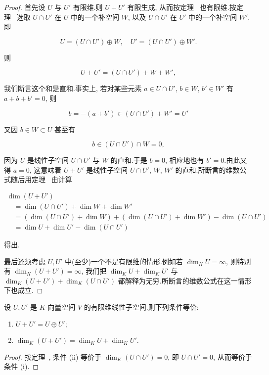 \begin{proof}
首先设 $U$ 与 $U'$ 有限维.则 $U + U'$ 有限生成, 从而按定理~ 也有限维.按定理~ 选取 $U \cap U'$ 在 $U$ 中的一个补空间 $W$, 以及 $U \cap U'$ 在 $U'$ 中的一个补空间 $W'$, 即

\[
U = (U \cap U') \oplus W, \quad U' = (U \cap U') \oplus W'\text{.}
\]

则

\[
U + U' = (U \cap U') + W + W',
\]

我们断言这个和是直和.事实上, 若对某些元素 $a \in U \cap U'$, $b \in W$, $b' \in W'$ 有 $a + b + b' = 0$, 则

\[
b = -(a + b') \in (U \cap U') + W' = U'
\]

又因 $b \in W \subset U$ 甚至有

\[
b \in (U \cap U') \cap W = 0,
\]

因为 $U$ 是线性子空间 $U \cap U'$ 与 $W$ 的直和.于是 $b = 0$, 相应地也有 $b' = 0$.由此又得 $a = 0$, 这意味着 $U + U'$ 是线性子空间 $U \cap U'$, $W$, $W'$ 的直和.所断言的维数公式随后用定理~ 由计算

\[
\begin{array}{l}
\dim (U + U') \\
\quad = \dim (U \cap U') + \dim W + \dim W' \\
\quad = \left(\dim (U \cap U') + \dim W\right) + \left(\dim (U \cap U') + \dim W'\right) - \dim (U \cap U') \\
\quad = \dim U + \dim U' - \dim (U \cap U')
\end{array}
\]

得出.

最后还须考虑 $U, U'$ 中(至少)一个不是有限维的情形.例如若 $\dim_K U = \infty$, 则特别有 $\dim_K (U + U') = \infty$, 我们把 $\dim_K U + \dim_K U'$ 与 $\dim_K (U + U') + \dim_K (U \cap U')$ 都解释为无穷.所断言的维数公式在这一情形下也成立.
\end{proof}

\begin{corollary}\label{cor:1.6.6}
设 $U, U'$ 是 $K$-向量空间 $V$ 的有限维线性子空间.则下列条件等价:
\begin{enumerate}
\item[(i)] $U + U' = U \oplus U'$;
\item[(ii)] $\dim_K (U + U') = \dim_K U + \dim_K U'$.
\end{enumerate}
\end{corollary}

\begin{proof}
按定理~, 条件 (ii) 等价于 $\dim_K (U \cap U') = 0$, 即 $U \cap U' = 0$, 从而等价于条件 (i).
\end{proof}

